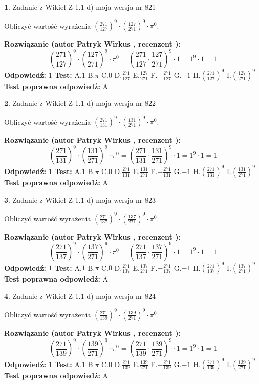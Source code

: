 \documentclass[12pt, a4paper]{article}
\theoremstyle{definition} %
\newtheorem{zad}{}
\newcommand{\zadStart}[1]{\begin{zad}#1\newline}
\newcommand{\zadStop}{\end{zad}}
\newcommand{\rozwStart}[2]{\noindent \textbf{Rozwiązanie (autor #1 , recenzent #2): }\newline}
\newcommand{\rozwStop}{\newline}
\newcommand{\odpStart}{\noindent \textbf{Odpowiedź:}\newline}
\newcommand{\odpStop}{\newline}
\newcommand{\testStart}{\noindent \textbf{Test:}\newline}
\newcommand{\testStop}{\newline}
\newcommand{\kluczStart}{\noindent \textbf{Test poprawna odpowiedź:}\newline}
\newcommand{\kluczStop}{\newline}
\begin{document}
\zadStart{Zadanie z Wikieł Z 1.1 d) moja wersja nr 821}

Obliczyć wartość wyrażenia $(\frac{271}{127})^{9} \cdot (\frac{127}{271})^{9} \cdot \pi^{0}$.
\zadStop
\rozwStart{Patryk Wirkus}{}
$$(\frac{271}{127})^{9} \cdot (\frac{127}{271})^{9} \cdot \pi^{0} = (\frac{271}{127} \cdot \frac{127}{271})^{9} \cdot 1 = 1^{9} \cdot 1 = 1$$
\rozwStop
\odpStart
$1$
\odpStop
\testStart
A.$1$ B.$\pi$ C.$0$ D.$\frac{271}{127}$ E.$\frac{127}{271}$
F.$-\frac{271}{127}$ G.$-1$
H.$(\frac{271}{127})^{9}$
I.$(\frac{127}{271})^{9}$
\testStop
\kluczStart
A
\kluczStop



\zadStart{Zadanie z Wikieł Z 1.1 d) moja wersja nr 822}

Obliczyć wartość wyrażenia $(\frac{271}{131})^{9} \cdot (\frac{131}{271})^{9} \cdot \pi^{0}$.
\zadStop
\rozwStart{Patryk Wirkus}{}
$$(\frac{271}{131})^{9} \cdot (\frac{131}{271})^{9} \cdot \pi^{0} = (\frac{271}{131} \cdot \frac{131}{271})^{9} \cdot 1 = 1^{9} \cdot 1 = 1$$
\rozwStop
\odpStart
$1$
\odpStop
\testStart
A.$1$ B.$\pi$ C.$0$ D.$\frac{271}{131}$ E.$\frac{131}{271}$
F.$-\frac{271}{131}$ G.$-1$
H.$(\frac{271}{131})^{9}$
I.$(\frac{131}{271})^{9}$
\testStop
\kluczStart
A
\kluczStop



\zadStart{Zadanie z Wikieł Z 1.1 d) moja wersja nr 823}

Obliczyć wartość wyrażenia $(\frac{271}{137})^{9} \cdot (\frac{137}{271})^{9} \cdot \pi^{0}$.
\zadStop
\rozwStart{Patryk Wirkus}{}
$$(\frac{271}{137})^{9} \cdot (\frac{137}{271})^{9} \cdot \pi^{0} = (\frac{271}{137} \cdot \frac{137}{271})^{9} \cdot 1 = 1^{9} \cdot 1 = 1$$
\rozwStop
\odpStart
$1$
\odpStop
\testStart
A.$1$ B.$\pi$ C.$0$ D.$\frac{271}{137}$ E.$\frac{137}{271}$
F.$-\frac{271}{137}$ G.$-1$
H.$(\frac{271}{137})^{9}$
I.$(\frac{137}{271})^{9}$
\testStop
\kluczStart
A
\kluczStop



\zadStart{Zadanie z Wikieł Z 1.1 d) moja wersja nr 824}

Obliczyć wartość wyrażenia $(\frac{271}{139})^{9} \cdot (\frac{139}{271})^{9} \cdot \pi^{0}$.
\zadStop
\rozwStart{Patryk Wirkus}{}
$$(\frac{271}{139})^{9} \cdot (\frac{139}{271})^{9} \cdot \pi^{0} = (\frac{271}{139} \cdot \frac{139}{271})^{9} \cdot 1 = 1^{9} \cdot 1 = 1$$
\rozwStop
\odpStart
$1$
\odpStop
\testStart
A.$1$ B.$\pi$ C.$0$ D.$\frac{271}{139}$ E.$\frac{139}{271}$
F.$-\frac{271}{139}$ G.$-1$
H.$(\frac{271}{139})^{9}$
I.$(\frac{139}{271})^{9}$
\testStop
\kluczStart
A
\kluczStop
\end{document}
